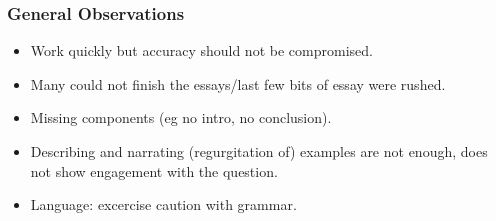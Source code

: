 \documentclass[../main.tex]{subfiles}
\begin{document}
        \subsubsection*{General Observations}
        \begin{itemize}
            \item Work quickly but accuracy should not be compromised.
            \item Many could not finish the essays/last few bits of essay were rushed.
            \item Missing components (eg no intro, no conclusion).
            \item Describing and narrating (regurgitation of) examples are not enough, does not show engagement with the question.
            \item Language: excercise caution with grammar.
        \end{itemize}
\end{document}
